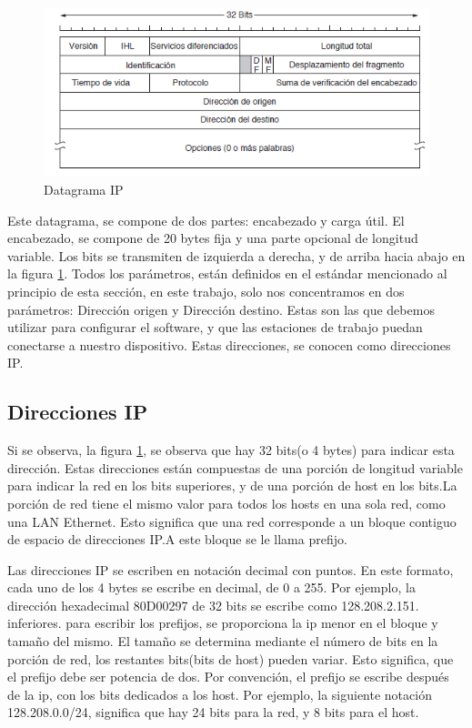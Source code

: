 \begin{figure}[ht]
	\centering
	\includegraphics{parte_2/redes/datagip}
	\caption{Datagrama IP}
	\label{fig:datIP}
\end{figure} 
Este datagrama, se compone de dos partes: encabezado y carga útil. El encabezado, se compone de 20 bytes fija y una parte opcional de longitud variable. Los bits se transmiten de izquierda a derecha, y de arriba hacia abajo en la figura \ref{fig:datIP}. Todos los parámetros, están definidos en el estándar mencionado al principio de esta sección, en este trabajo, solo nos concentramos en dos parámetros: Dirección origen y Dirección destino. Estas son las que debemos utilizar para configurar el software, y que las estaciones de trabajo puedan conectarse a nuestro dispositivo. Estas direcciones, se conocen como direcciones IP. 
\subsection{Direcciones IP} 
Si se observa, la figura \ref{fig:datIP}, se observa que hay 32 bits(o 4 bytes) para indicar esta dirección. Estas direcciones están compuestas de una porción de longitud variable para indicar la red en los bits superiores, y de una porción de host en los bits.La porción de red tiene el mismo valor para todos los hosts en una sola red, como una LAN Ethernet. Esto significa que una red corresponde a un bloque contiguo de espacio de direcciones IP.A este bloque se le llama prefijo. 

Las direcciones IP se escriben en notación decimal con puntos. En este formato, cada uno de los 4 bytes se escribe en decimal, de 0 a 255. Por ejemplo, la dirección hexadecimal 80D00297 de 32 bits se escribe como 128.208.2.151.  
inferiores. para escribir los prefijos, se proporciona la ip menor en el bloque y tamaño del mismo. El tamaño se determina mediante el número de bits en la porción de red, los restantes bits(bits de host) pueden variar. Esto significa, que el prefijo debe ser potencia de dos. Por convención, el prefijo se escribe después de la ip, con los bits dedicados a los host. Por ejemplo, la siguiente notación 128.208.0.0/24, significa que hay 24 bits para la red, y 8 bits para el host. 

